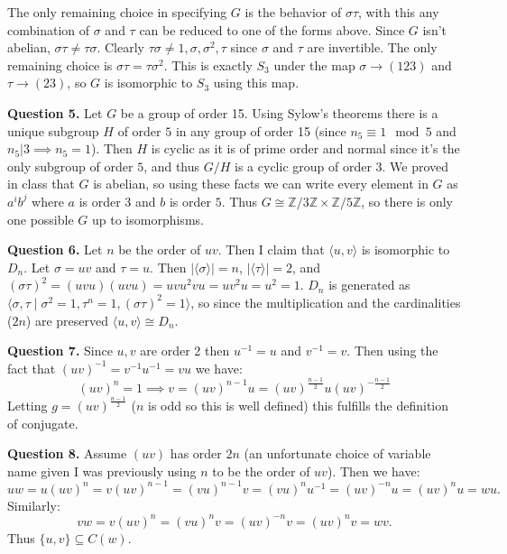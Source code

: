 \documentclass[letterpaper, reqno,11pt]{article}
\begin{document}
The only remaining choice in specifying $G$ is the behavior of $\sigma\tau$, with this any combination of $\sigma$ and $\tau$ can be reduced to one of the forms above. Since $G$ isn't abelian, $\sigma\tau\neq \tau\sigma$. Clearly $\tau\sigma\neq 1,\sigma,\sigma^2,\tau$ since $\sigma$ and $\tau$ are invertible. The only remaining choice is $\sigma\tau=\tau\sigma^2$. This is exactly $S_3$ under the map  $\sigma\to (123)$ and $\tau\to (23)$, so $G$ is isomorphic to $S_3$ using this map. 

{\medskip\noindent\bf Question 5.} Let $G$ be a group of order 15. Using Sylow's theorems there is a unique subgroup $H$ of order $5$ in any group of order 15 (since $n_5\equiv 1\mod 5$ and $n_5|3\implies n_5=1$). Then $H$ is cyclic as it is of prime order and normal since it's the only subgroup of order $5$, and thus $G /H$ is a cyclic group of order 3. We proved in class that $G$ is abelian, so using these facts we can write every element in $G$ as $a^{i}b^{j}$ where $a$ is order $3$ and $b$ is order $5$. Thus $G\cong \mathbb{Z}/3\mathbb{Z}\times \mathbb{Z}/5\mathbb{Z}$, so there is only one possible $G$ up to isomorphisms.

{\medskip\noindent\bf Question 6.} Let $n$ be the order of $uv$. Then I claim that $\langle u,v\rangle$ is isomorphic to $D_n$. Let $\sigma=uv$ and $\tau=u$. Then $|\langle \sigma\rangle|=n$, $|\langle \tau\rangle|=2$, and $(\sigma\tau)^2=(uvu)(uvu)=uvu^2vu=uv^2u=u^2=1$. $D_n$ is generated as $\langle\sigma,\tau\mid \sigma^2=1,\tau^{n}=1,(\sigma\tau)^2=1\rangle$, so since the multiplication and the cardinalities ($2n$) are preserved $\langle u,v\rangle\cong D_n$.


{\medskip\noindent\bf Question 7.} Since $u,v$ are order 2 then $u^{-1}=u$ and $v^{-1}=v$. Then using the fact that $(uv)^{-1}=v^{-1}u^{-1}=vu$ we have:
\[
    (uv)^{n}=1\implies v=(uv)^{n-1}u=(uv)^{\frac{n-1}{2}}u(uv)^{-\frac{n-1}{2}}
\]
Letting $g=(uv)^{\frac{n-1}{2}}$ ($n$ is odd so this is well defined) this fulfills the definition of conjugate.

{\medskip\noindent\bf Question 8.} Assume $(uv)$ has order $2n$ (an unfortunate choice of variable name given I was previously using $n$ to be the order of $uv$). Then we have:
\[
uw=u(uv)^{n}=v(uv)^{n-1}=(vu)^{n-1}v=(vu)^{n}u^{-1}=(uv)^{-n}u=(uv)^{n}u=wu
.\]
Similarly:
\[
vw=v(uv)^{n}=(vu)^{n}v=(uv)^{-n}v=(uv)^{n}v=wv
.\]
Thus $\{u,v\}\subseteq C(w)$.
\end{document}
